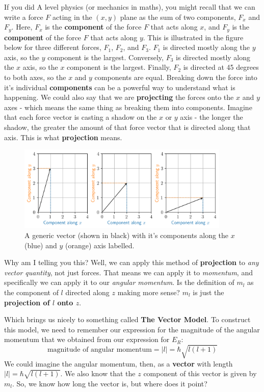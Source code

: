 \documentclass{memoir}[11pt,oneside,a4paper,openany]
\begin{document}
If you did A level physics (or mechanics in maths), you might recall that we can write a force $F$ acting in the $(x,y)$ plane as the sum of two components, $F_x$ and $F_y$. Here, $F_x$ is the \textbf{component} of the force $F$ that acts along $x$, and $F_y$ is the \textbf{component} of the force $F$ that acts along $y$. This is illustrated in the figure below for three different forces, $F_1$, $F_2$, and $F_3$. $F_1$ is directed mostly along the $y$ axis, so the $y$ component is the largest. Conversely, $F_3$ is directed mostly along the $x$ axis, so the $x$ component is the largest. Finally, $F_2$ is directed at 45 degrees to both axes, so the $x$ and $y$ components are equal. Breaking down the force into it's individual \textbf{components} can be a powerful way to understand what is happening. We could also say that we are \textbf{projecting} the forces onto the $x$ and $y$ axes - which means the same thing as breaking them into components. Imagine that each force vector is casting a shadow on the $x$ or $y$ axis - the longer the shadow, the greater the amount of that force vector that is directed along that axis. This is what \textbf{projection} means.

\begin{figure}[h]
	\centering
	\includegraphics[width=0.9\textwidth]{force_components}
	\caption{A generic vector (shown in black) with it's components along the $x$ (blue) and $y$ (orange) axis labelled.}\label{fig:force_components}
\end{figure}
Why am I telling you this? Well, we can apply this method of \textbf{projection} to \emph{any vector quantity}, not just forces. That means we can apply it to \emph{momentum}, and specifically we can apply it to our \emph{angular momentum}. Is the definition of $m_l$ as the component of $l$ directed along $z$ making more sense? $m_l$ is just the \textbf{projection of $l$ onto $z$}.

Which brings us nicely to something called \textbf{The Vector Model}. To construct this model, we need to remember our expression for the magnitude of the angular momentum that we obtained from our expression for $E_R$:
\begin{equation}
	\text{magnitude of angular momentum} = \lvert l \rvert = \hbar\sqrt{l(l+1)}
\end{equation}
We could imagine the angular momentum, then, as a \textbf{vector} with length $\lvert l \rvert = \hbar\sqrt{l(l+1)}$. We also know that the $z$ component of this vector is given by $m_l$. So, we know how long the vector is, but where does it point?   
\end{document}
